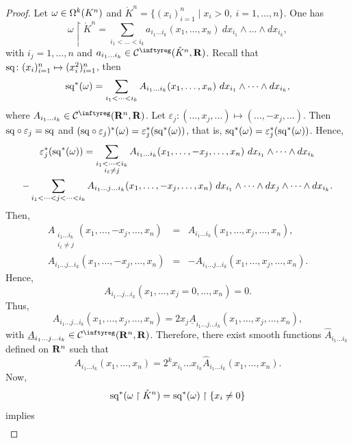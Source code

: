 \begin{proof}
  Let $\omega \in \Omega^k(K^n)$ and $\mathring K^n = \{ (x_i)_{i=1}^n \mid x_i > 0,\ i=1,\dots,n \}$.
  One has
  $$%
    \omega \restriction \mathring K^n = \sum_{i_1<\dots<i_k} a_{i_1 \dots i_k}(x_1, \dots, x_n)\ dx_{i_1} \wedge \dots \wedge dx_{i_k},
  $$%
  with $i_j = 1,\dots,n$ and $a_{i_1 \dots i_k} \in \Cinfty(\mathring K^n,\RR)$.
  Recall that ${\operatorname{sq}} \colon (x_i)_{i=1}^n \mapsto (x_i^2)_{i=1}^n$,
  then
  $$%
    \Sq^*(\omega) = \sum_{i_1<\dots<i_k} A_{i_1 \dots i_k}(x_1,\dots, x_n)\ dx_{i_1} \wedge \dots \wedge dx_{i_k},
  $$%
  where $A_{i_1 \dots i_k} \in \Cinfty(\RR^n,\RR)$.
  Let $\varepsilon_j : (\dots, x_j,\dots) \mapsto (\dots, -x_j,\dots)$.
  Then ${\operatorname{sq}} \circ \varepsilon_j = {\operatorname{sq}}$ and $({\operatorname{sq}} \circ \varepsilon_j)^*(\omega) = \varepsilon_j^*({\operatorname{sq}}^*(\omega))$,
  that is,
  ${\operatorname{sq}}^*(\omega) = \varepsilon_j^*({\operatorname{sq}}^*(\omega))$.
  Hence,
  \begin{multline*}
    \varepsilon_j^*({\operatorname{sq}}^*(\omega)) = \sum_{\substack{i_1<\dots<i_k \\ i_\ell \neq j}} A_{i_1 \dots i_k}(x_1,\dots, -x_j,\dots, x_n)\ dx_{i_1} \wedge \dots \wedge dx_{i_k} \\
    - \sum_{\substack{i_1 < \dots < j < \dots < i_k}} A_{i_1\dots j \dots i_k}(x_1,\dots, -x_j,\dots, x_n)\ dx_{i_1} \wedge \dots \wedge dx_j \wedge \dots \wedge dx_{i_k}.
  \end{multline*}
  Then,
  \begin{eqnarray*}
    A_{\substack{i_1 \dots i_k \\ i_\ell \neq j}}(x_1,\dots, -x_j,\dots, x_n) & = & A_{i_1 \dots i_k}(x_1,\dots, x_j,\dots, x_n), \\
    A_{i_1 \dots j \dots i_k}(x_1,\dots, -x_j,\dots, x_n) & = & - A_{i_1\dots j \dots i_k}(x_1,\dots, x_j,\dots, x_n).
  \end{eqnarray*}
  Hence,
  $$%
    A_{i_1 \dots j \dots i_k}(x_1,\dots, x_j=0,\dots, x_n) = 0.
  $$%
  Thus,
  $$%
    A_{i_1\dots j \dots i_k}(x_1,\dots, x_j,\dots, x_n) = 2 x_j \underline{A}_{i_1\dots j \dots i_k}(x_1,\dots, x_j,\dots, x_n),
  $$%
  with $\underline{A}_{i_1\dots j \dots i_k} \in \Cinfty(\RR^n,\RR)$.
  Therefore,
  there exist smooth functions $\hat A_{i_1\dots i_k}$ defined on $\mathbf{R}^n$ such that
  $$%
    A_{i_1 \dots i_k}(x_1,\dots, x_n) = 2^k x_{i_1}\dots x_{i_k} \hat A_{i_1\dots i_k}(x_1,\dots, x_n).
  $$%
  Now,
  $$%
    \Sq^*(\omega\restriction \mathring K^n) = \Sq^*(\omega) \restriction \{x_i \neq 0\}
  $$%
  implies
  \begin{align*}

\end{align*}
\end{proof}
